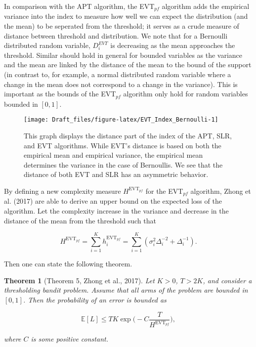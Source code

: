 \documentclass[12pt,]{article}
\newtheorem{theorem}{Theorem}
\begin{document}
In comparison with the APT algorithm, the EVT\(_{pf}\) algorithm adds
the empirical variance into the index to measure how well we can expect
the distribution (and the mean) to be seperated from the threshold; it
serves as a crude measure of distance between threshold and
distribution. We note that for a Bernoulli distributed random variable,
\(D_i^{EVT}\) is decreasing as the mean approaches the threshold.
Similar should hold in general for bounded variables as the variance and
the mean are linked by the distance of the mean to the bound of the
support (in contrast to, for example, a normal distributed random
variable where a change in the mean does not correspond to a change in
the variance). This is important as the bounds of the EVT\(_{pf}\)
algorithm only hold for random variables bounded in \([0,1]\).

\begin{figure}

{\centering \texttt{[image: Draft\_files/figure-latex/EVT\_Index\_Bernoulli-1]} 

}

\caption{This graph displays the distance part of the index of the APT, SLR, and EVT algorithms. While EVT's distance is based on both the empirical mean and empirical variance, the empirical mean determines the variance in the case of Bernoullis. We see that the distance of both EVT and SLR has an asymmetric behavior.}\label{fig:EVT_Index_Bernoulli}
\end{figure}

By defining a new complexity measure \(H^{\text{EVT}_{pf}}\) for the
EVT\(_{pf}\) algorithm, Zhong et al. (2017) are able to derive an upper
bound on the expected loss of the algorithm. Let the complexity increase
in the variance and decrease in the distance of the mean from the
threshold such that

\[
H^{\text{EVT}_{pf}} = \sum_{i=1}^K h_i^{\text{EVT}_{pf}} = \sum_{i=1}^K (\sigma_i^2\Delta_i^{-2} + \Delta_i^{-1}).
\]

Then one can state the following theorem.

\begin{theorem}[Theorem 5, Zhong et al., 2017] 
\label{theorem:ZhongEtAl2017Theorem5}
Let $K > 0$, $T > 2K$, and consider a thresholding bandit problem. Assume that all arms of the problem are bounded in $[0,1]$. Then the probability of an error is bounded as

\begin{equation*}
\mathbb{E}[L] \leq TK \exp\Big(-C\frac{T}{H^{\text{EVT}_{pf}}}\Big),
\end{equation*}

where $C$ is some positive constant.
\end{theorem}
\end{document}
